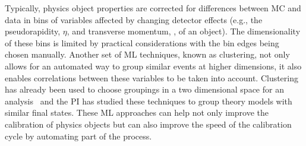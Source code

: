 \documentclass[letter, USenglish, 11pt, subfigure]{article}
\begin{document}
Typically, physics object properties are corrected for differences between MC and data in bins of variables affected by changing detector effects (e.g., the pseudorapidity, $\eta$, and transverse momentum, \pt, of an object). The dimensionality of these bins is limited by practical considerations with the bin edges being chosen manually. Another set of ML techniques, known as clustering, not only allows for an automated way to group similar events at higher dimensions, it also enables correlations between these variables to be taken into account. Clustering has already been used to choose groupings in a two dimensional space for an analysis~\cite{ttH_tau_CMS} and the PI has studied these techniques to group theory models with similar final states. These ML approaches can help not only improve the calibration of physics objects but can also improve the speed of the calibration cycle by automating part of the process.
\end{document}
